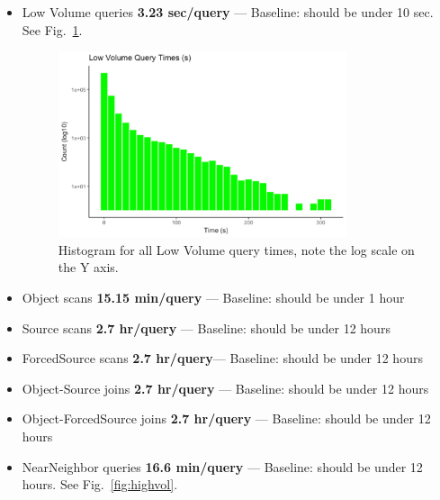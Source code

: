 \documentclass[DM,toc]{lsstdoc}
\begin{document}
\begin{itemize}
  \begin{itemize}
  \item
    Low Volume queries \textbf{3.23 sec/query} --- Baseline: should be
    under 10 sec. See Fig.~\ref{fig:lowvol}.

\begin{figure}
  \begin{center}
    \includegraphics[width=0.8\textwidth]{LV_times}
    \caption{Histogram for all Low Volume query times, note the log scale on
  the Y axis.}
    \label{fig:lowvol}
  \end{center}
\end{figure}

  \item
    Object scans \textbf{15.15 min/query} --- Baseline: should be under
    1 hour
  \item
    Source scans \textbf{2.7 hr/query} --- Baseline: should be under 12
    hours
  \item
    ForcedSource scans \textbf{2.7 hr/query}--- Baseline: should be
    under 12 hours
  \item
    Object-Source joins \textbf{2.7 hr/query} --- Baseline: should be
    under 12 hours
  \item
    Object-ForcedSource joins \textbf{2.7 hr/query} --- Baseline: should
    be under 12 hours
  \item
    NearNeighbor queries \textbf{16.6 min/query} --- Baseline: should be
    under 12 hours. See Fig.~\ref{fig:highvol}.


\end{itemize}
\end{itemize}
\end{document}
